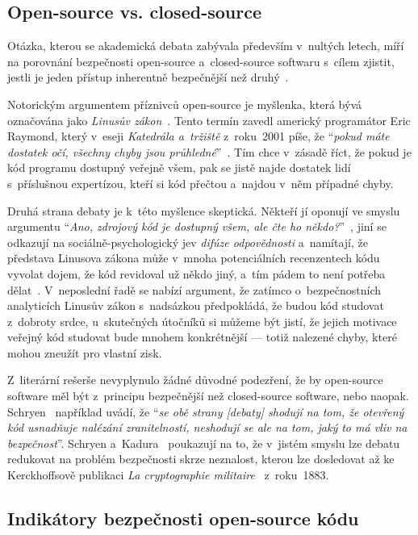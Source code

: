 \subsection{Open-source vs. closed-source}

Otázka, kterou se akademická debata zabývala především v~nultých letech, míří na porovnání bezpečnosti open-source a~closed-source softwaru s~cílem zjistit, jestli je jeden přístup inherentně bezpečnější než druhý~\cite{oss-security-literature}.

Notorickým argumentem příznivců open-source je myšlenka, která bývá označována jako \emph{Linusův zákon}~\cite{osslinuslaw2014}. Tento termín zavedl americký programátor Eric Raymond, který v~eseji \emph{Katedrála a~tržiště} z~roku~2001 píše, že ``\textit{pokud máte dostatek očí, všechny chyby jsou průhledné}''~\cite{raymond1999cathedral}. Tím chce v~zásadě říct, že pokud je kód programu dostupný veřejně všem, pak se jistě najde dostatek lidí s~příslušnou expertízou, kteří si kód přečtou a~najdou v~něm případné chyby.

Druhá strana debaty je k~této myšlence skeptická. Někteří jí oponují ve smyslu argumentu ``\textit{Ano, zdrojový kód je dostupný všem, ale čte ho někdo?}''~\cite{open-vs-closed}, jiní se odkazují na sociálně-psychologický jev \emph{difúze odpovědnosti} a~namítají, že představa Linusova zákona může v~mnoha potenciálních recenzentech kódu vyvolat dojem, že kód revidoval už někdo jiný, a~tím pádem to není potřeba dělat~\cite{osslinuslaw2014}. V~neposlední řadě se nabízí argument, že zatímco o~bezpečnostních analyticích Linusův zákon s~nadsázkou předpokládá, že budou kód studovat z~dobroty srdce, u~skutečných útočníků si můžeme být jistí, že jejich motivace veřejný kód studovat bude mnohem konkrétnější --- totiž nalezené chyby, které mohou zneužít pro vlastní zisk.

Z~literární rešerše nevyplynulo žádné důvodné podezření, že by open-source software měl být z~principu bezpečnější než closed-source software, nebo naopak. Schryen~\cite{schryen2009security-debate} například uvádí, že ``\textit{se obě strany [debaty] shodují na tom, že otevřený kód usnadňuje nalézání zranitelností, neshodují se ale na tom, jaký to má vliv na bezpečnost}''. Schryen a~Kadura~\cite{open-vs-closed} poukazují na to, že v~jistém smyslu lze debatu redukovat na problém bezpečnosti skrze neznalost, kterou lze dosledovat až ke Kerckhoffsově publikaci \emph{La cryptographie militaire}~\cite{kerckhoffs1883cryptographie} z~roku~1883.

\subsection{Indikátory bezpečnosti open-source kódu}

